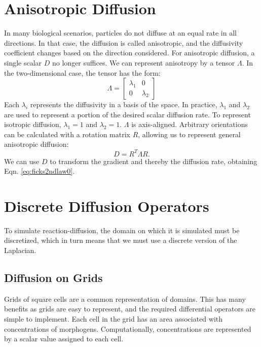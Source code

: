 \section{Anisotropic Diffusion}
In many biological scenarios, particles do not diffuse at an equal rate in all directions. In that case, the diffusion is called anisotropic, and the diffusivity coefficient changes based on the direction considered. For anisotropic diffusion, a single scalar $D$ no longer suffices. We can represent anisotropy by a tensor $\Lambda$. In the two-dimensional case, the tensor has the form:
\begin{equation}
\label{eq:diffTensor}
\Lambda =
\begin{bmatrix}
    \lambda_1 & 0 \\
    0 & \lambda_2 
\end{bmatrix}
\end{equation}
Each $\lambda_i$ represents the diffusivity in a basis of the space. In practice, $\lambda_1$ and $\lambda_2$ are used to represent a portion of the desired scalar diffusion rate. To represent isotropic diffusion, $\lambda_1=1$ and $\lambda_2=1$. $\Lambda$ is axis-aligned. Arbitrary orientations can be calculated with a rotation matrix $R$, allowing us to represent general anisotropic diffusion:
\begin{equation}
\label{eq:anisoDiffTensor}
	D = R^T \Lambda R.
\end{equation}
We can use $D$ to transform the gradient and thereby the diffusion rate, obtaining Eqn. \ref{eq:ficks2ndlaw0}.

\section{Discrete Diffusion Operators}
To simulate reaction-diffusion, the domain on which it is simulated must be discretized, which in turn means that we must use a discrete version of the Laplacian.

\subsection{Diffusion on Grids}
Grids of square cells are a common representation of domains. This has many benefits as grids are easy to represent, and the required differential operators are simple to implement. Each cell in the grid has an area associated with concentrations of morphogens. Computationally, concentrations are represented by a scalar value assigned to each cell.

